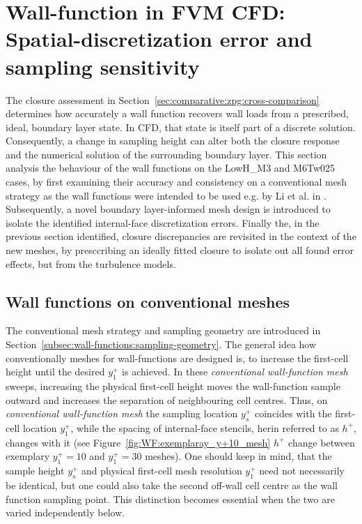 \section{Wall-function in FVM CFD: Spatial-discretization error and sampling sensitivity}
\label{subsec:comparative:zpg:yplus-sensitivity}

The closure assessment in Section~\ref{sec:comparative:zpg:cross-comparison} determines how accurately a wall function recovers wall loads from a prescribed, ideal, boundary layer state. In CFD, that state is itself part of a discrete solution. Consequently, a change in sampling height can alter both the closure response and the numerical solution of the surrounding boundary layer. This section analysis the behaviour of the wall functions on the LowH\_M3 and M6Tw025 cases, by first examining their accuracy and consistency on a conventional mesh strategy as the wall functions were intended to be used e.g. by Li et al. in \cite{li2025WF}. Subsequently, a novel boundary layer-informed mesh design is introduced to isolate the identified internal-face discretization errors. Finally the, in the previous section identified, closure discrepancies are revisited in the context of the new meshes, by presccribing an ideally fitted closure to isolate out all found error effects, but from the turbulence models.

\subsection{Wall functions on conventional meshes}
\label{subsec:comparative:zpg:conventional-mesh}

The conventional mesh strategy and sampling geometry are introduced in Section~\ref{subsec:wall-functions:sampling-geometry}. The general idea how conventionally meshes for wall-functions are designed is, to increase the first-cell height until the desired \(y^+_1\) is achieved. In these \textit{conventional wall-function mesh} sweeps, increasing the physical first-cell height moves the wall-function sample outward and increases the separation of neighbouring cell centres. Thus, on \textit{conventional wall-function mesh} the sampling location $y_s^+$ coincides with the first-cell location $y_1^+$, while the spacing of internal-face stencils, herin referred to as \(h^+\),  changes with it (see Figure~\ref{fig:WF:exemplaray_y+10_mesh} \(h^+\) change between exemplary \(y^+_1 = 10\) and \(y^+_1 = 30\) meshes). One should keep in mind, that the sample height $y_s^+$ and physical first-cell mesh resolution \(y^+_1\) need not necessarily be identical, but one could also take the second off-wall cell centre as the wall function sampling point. This distinction becomes essential when the two are varied independently below.
\par\medskip

